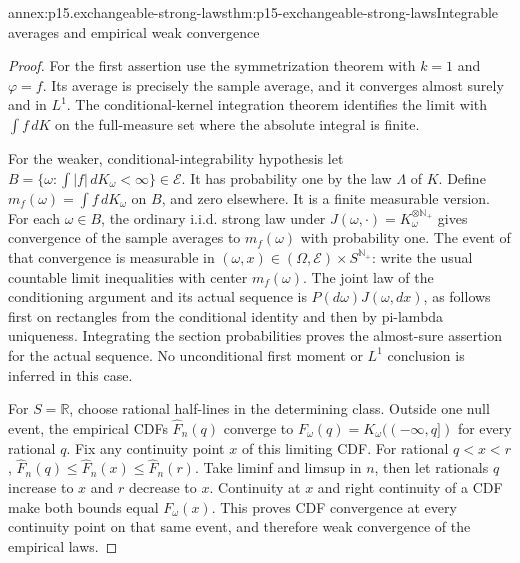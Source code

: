\begin{annexitem}{annex:p15.exchangeable-strong-laws}{thm:p15-exchangeable-strong-laws}{Integrable averages and empirical weak convergence}
\begin{proof}
For the first assertion use the symmetrization theorem with \(k=1\)
and \(\varphi=f\). Its average is precisely the sample average,
and it converges almost surely and in \(L^1\).
The conditional-kernel integration theorem identifies the limit with
\(\int f\,dK\) on the full-measure set where the absolute integral
is finite.

For the weaker, conditional-integrability hypothesis let
\(B=\{\omega:\int|f|\,dK_\omega<\infty\}\in\mathcal E\).
It has probability one by the law \(\Lambda\) of \(K\).
Define \(m_f(\omega)=\int f\,dK_\omega\) on \(B\), and zero elsewhere.
It is a finite measurable version.
For each \(\omega\in B\), the ordinary i.i.d. strong law under
\(J(\omega,\cdot)=K_\omega^{\otimes\mathbb N_+}\) gives convergence
of the sample averages to \(m_f(\omega)\) with probability one.
The event of that convergence is measurable in
\((\omega,x)\in(\Omega,\mathcal E)\times S^{\mathbb N_+}\):
write the usual countable limit inequalities with center \(m_f(\omega)\).
The joint law of the conditioning argument and its actual sequence
is \(P(d\omega)J(\omega,dx)\), as follows first on rectangles from the
conditional identity and then by pi-lambda uniqueness.
Integrating the section probabilities proves the almost-sure
assertion for the actual sequence. No unconditional first moment
or \(L^1\) conclusion is inferred in this case.

For \(S=\mathbb R\), choose rational half-lines in the determining
class. Outside one null event, the empirical CDFs
\(\widehat F_n(q)\) converge to \(F_\omega(q)=K_\omega((-\infty,q])\)
for every rational \(q\).
Fix any continuity point \(x\) of this limiting CDF.
For rational \(q<x<r\),
\(\widehat F_n(q)\leq\widehat F_n(x)\leq\widehat F_n(r)\).
Take liminf and limsup in \(n\), then let rationals \(q\) increase
to \(x\) and \(r\) decrease to \(x\).
Continuity at \(x\) and right continuity of a CDF make both bounds
equal \(F_\omega(x)\).
This proves CDF convergence at every continuity point on that same
event, and therefore weak convergence of the empirical laws.
\end{proof}
\end{annexitem}

